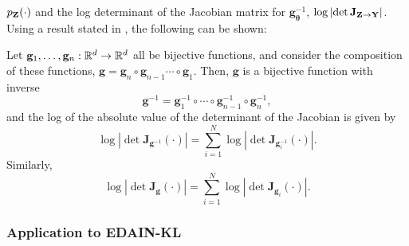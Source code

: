 \documentclass{statsmsc}
\begin{document}
$p_{\mathbf{Z}}(\cdot)$ and the log determinant of the Jacobian matrix for $\mathbf{g}_{\bm\theta}^{-1}$,
$\log \left|\det \mathbf{J}_{\mathbf{Z} \rightarrow {\mathbf{Y}}} \right|$. Using a result
stated in \citeauthor{normalizing_flows}, the following can be shown:
\begin{theorem}\label{thrm:normFlow}
    Let $\mathbf{g}_1,\dots, \mathbf{g}_n:\mathbb{R}^d \rightarrow {\mathbb{R}^d}$ all be bijective functions, and consider
    the composition of these functions, $\mathbf{g}=\mathbf{g}_n \circ \mathbf{g}_{n-1} \cdots \circ \mathbf{g}_1$.
    Then, $\mathbf{g}$ is a bijective function with inverse
    \begin{equation}
        \mathbf{g}^{-1}=\mathbf{g}_1^{-1} \circ \cdots \circ \mathbf{g}_{n-1}^{-1} \circ \mathbf{g}_n^{-1},
    \end{equation}
    and the log of the absolute value of the determinant of the Jacobian is given by
    \begin{equation}
        \log \left| \det \mathbf{J}_{\mathbf{g}^{-1}}(\cdot)\right|
        = \sum_{i=1}^N \log\left|\det \mathbf{J}_{\mathbf{g}_i^{-1}}(\cdot) \right|.
    \end{equation}
    Similarly,
    \begin{equation}
        \log \left| \det \mathbf{J}_{\mathbf{g}}(\cdot)\right|
        = \sum_{i=1}^N \log \left|\det \mathbf{J}_{\mathbf{g}_i}(\cdot) \right|.
    \end{equation}
\end{theorem}

\subsubsection{Application to EDAIN-KL}%
\label{ssub:Application to EDAIN-KL}
\end{document}
